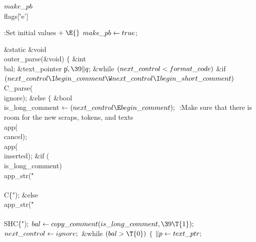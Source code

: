 \Y\B\4\D$\\{make\_pb}$ \5
\\{flags}[\.{'e'}]\par
\Y\B\4:Set initial values\X${}\mathrel+\E{}$\6
$\\{make\_pb}\leftarrow\\{true}{}$;\par
\fi

\B\1\1\&{static} \&{void} \\{outer\_parse}(\&{void})\2\2\6
${}\{{}$\1\6
\&{int} \\{bal};\6
\&{text\_pointer} \|p${},\39\|q{}$;\7
\&{while} ${}(\\{next\_control}<\\{format\_code}){}$\1\6
\&{if} ${}(\\{next\_control}\I\\{begin\_comment}\W\\{next\_control}\I\\{begin%
\_short\_comment}){}$\1\5
\\{C\_parse}(\\{ignore});\2\6
\&{else}\5
${}\{{}$\1\6
\&{bool} \\{is\_long\_comment}${}\K(\\{next\_control}\E\\{begin\_comment});{}$\7
:Make sure that there is room for the new scraps, tokens, and texts\X\6
\\{app}(\\{cancel});\6
\\{app}(\\{inserted});\6
\&{if} (\\{is\_long\_comment})\1\5
\\{app\_str}(\.{"\\\\C\{"});\2\6
\&{else}\1\5
\\{app\_str}(\.{"\\\\SHC\{"});\2\6
${}\\{bal}\K\\{copy\_comment}(\\{is\_long\_comment},\39\T{1});{}$\6
${}\\{next\_control}\leftarrow\\{ignore};{}$\6
\&{while} ${}(\\{bal}>\T{0}){}$\5
${}\{{}$\1\6
${}\|p\leftarrow\\{text\_ptr};{}$\6
